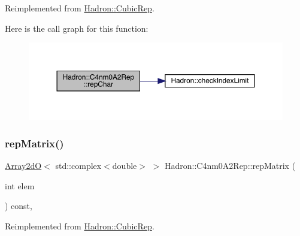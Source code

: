 Reimplemented from \mbox{\hyperlink{structHadron_1_1CubicRep_af45227106e8e715e84b0af69cd3b36f8}{Hadron\+::\+Cubic\+Rep}}.

Here is the call graph for this function\+:
\nopagebreak
\begin{figure}[H]
\begin{center}
\leavevmode
\includegraphics[width=350pt]{d2/db9/structHadron_1_1C4nm0A2Rep_ad4d1ed2c8ee991654f7c1369f487a810_cgraph}
\end{center}
\end{figure}
\mbox{\label{structHadron_1_1C4nm0A2Rep_aac52fe57a274d94bbaef9c6b2699e1c9}} 
\subsubsection{\texorpdfstring{repMatrix()}{repMatrix()}\hspace{0.1cm}{\footnotesize\ttfamily [1/3]}}
{\footnotesize\ttfamily \mbox{\hyperlink{classADAT_1_1Array2dO}{Array2dO}}$<$ std\+::complex$<$double$>$ $>$ Hadron\+::\+C4nm0\+A2\+Rep\+::rep\+Matrix (\begin{DoxyParamCaption}\item[{int}]{elem }\end{DoxyParamCaption}) const\hspace{0.3cm}{\ttfamily [inline]}, {\ttfamily [virtual]}}



Reimplemented from \mbox{\hyperlink{structHadron_1_1CubicRep_ac5d7e9e6f4ab1158b5fce3e4ad9e8005}{Hadron\+::\+Cubic\+Rep}}.

